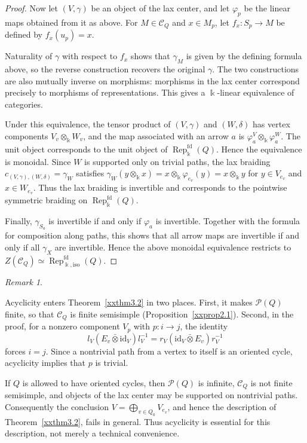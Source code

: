 \documentclass{amsart}
\newcommand{\id}{\mathrm{id}}
\newcommand{\btensor}{\mathbin{\bar{\otimes}}}
\theoremstyle{definition}
\theoremstyle{remark}
\newtheorem{remark}[theorem]{Remark}
\numberwithin{equation}{section}
\begin{document}
\begin{proof}
Now let $(V,\gamma)$ be an object of the lax center, and let
$\varphi_p$ be the linear maps obtained from it as above.
For $M\in\mathcal C_Q$ and $x\in M_p$, let
$f_x\colon S_p\to M$ be defined by $f_x(u_p)=x$.

Naturality of $\gamma$ with respect to $f_x$ shows that $\gamma_M$ is
given by the defining formula above, so the reverse construction
recovers the original $\gamma$.
The two constructions are also mutually inverse on morphisms: morphisms
in the lax center correspond precisely to morphisms of representations.
This gives a $\Bbbk$-linear equivalence of categories.

Under this equivalence, the tensor product of
$(V,\gamma)$ and $(W,\delta)$ has vertex components
$V_v\otimes_{\Bbbk}W_v$, and the map associated with an arrow $a$ is
$\varphi^V_a\otimes_{\Bbbk}\varphi^W_a$.
The unit object corresponds to the unit object of
$\operatorname{Rep}^{\mathrm{fd}}_{\Bbbk}(Q)$. Hence the equivalence is monoidal.
Since $W$ is supported only on trivial paths, the lax braiding
$c_{(V,\gamma),(W,\delta)}=\gamma_W$ satisfies
$\gamma_W(y\otimes_{\Bbbk} x)=x\otimes_{\Bbbk}\varphi_{e_v}(y)=x\otimes_{\Bbbk} y$
for $y\in V_{e_v}$ and $x\in W_{e_v}$.
Thus the lax braiding is invertible and corresponds to the
pointwise symmetric braiding on
$\operatorname{Rep}^{\mathrm{fd}}_{\Bbbk}(Q)$.

Finally,
$\gamma_{S_a}$
is invertible if and only if
$\varphi_a$
is invertible.
Together with the formula for composition along paths, this shows that
all arrow maps are invertible if and only if all
$\gamma_X$
are invertible.
Hence the above monoidal equivalence restricts to
$Z(\mathcal C_Q)\simeq
\operatorname{Rep}^{\mathrm{fd}}_{\Bbbk,\mathrm{iso}}(Q)$.
\end{proof}

\begin{remark}\label{xxrem3.3}

Acyclicity enters
Theorem~\ref{xxthm3.2} in two places. First,
it makes $\mathcal P(Q)$ finite, so that $\mathcal C_Q$ is finite
semisimple (Proposition~\ref{xxprop2.1}). Second, in
the proof, for a nonzero component $V_p$ with $p\colon i\to j$, the
identity
\[
l_V(E_v\btensor\id_V)l_V^{-1}
=
r_V(\id_V\btensor E_v)r_V^{-1}
\]
forces $i=j$. Since a nontrivial path from a vertex to itself is an
oriented cycle, acyclicity implies that $p$ is trivial.

If $Q$ is allowed to have oriented cycles, then $\mathcal P(Q)$ is
infinite, $\mathcal C_Q$ is not finite semisimple, and objects of the lax
center may be supported on nontrivial paths. Consequently the conclusion
$V=\bigoplus_{v\in Q_0}V_{e_v}$, and hence the description of
Theorem~\ref{xxthm3.2}, fails in general.
Thus acyclicity is essential for this description, not merely a technical
convenience.

\end{remark}
\end{document}
